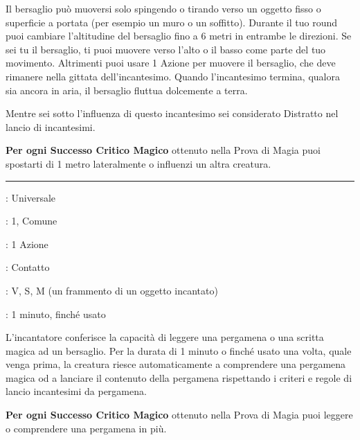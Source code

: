 \begin{multicols}{2}
Il bersaglio può muoversi solo spingendo o tirando verso un oggetto fisso o superficie a portata (per esempio un muro o un soffitto). Durante il tuo round puoi cambiare l'altitudine del bersaglio fino a 6 metri in entrambe le direzioni. Se sei tu il bersaglio, ti puoi muovere verso l'alto o il basso come parte del tuo movimento. Altrimenti puoi usare 1 Azione per muovere il bersaglio, che deve rimanere nella gittata dell'incantesimo. Quando l'incantesimo termina, qualora sia ancora in aria, il bersaglio fluttua dolcemente a terra.

Mentre sei sotto l'influenza di questo incantesimo sei considerato Distratto nel lancio di incantesimi.

\textbf{Per ogni Successo Critico Magico} ottenuto nella Prova di Magia puoi spostarti di 1 metro lateralmente o influenzi un altra creatura.

\smallskip\noindent\rule{\linewidth}{2pt} \hypertarget{Lettura del Magico}{}\medskip{}
\noindent
\begin{description}[noitemsep, topsep=0pt, parsep=0pt, partopsep=0pt, leftmargin=0cm, labelwidth=2.8cm]
	\item[\textbf{Lista di Magia}]: Universale
	\item[\textbf{Livello}]: 1, Comune
	\item[\textbf{T. di Lancio}]: 1 Azione
	\item[\textbf{Gittata}]: Contatto
	\item[\textbf{Componenti}]: V, S, M (un frammento di un oggetto incantato)
	\item[\textbf{Durata}]: 1 minuto, finché usato
\end{description}

L'incantatore conferisce la capacità di leggere una pergamena o una scritta magica ad un bersaglio. Per la durata di 1 minuto o finché usato una volta, quale venga prima, la creatura riesce automaticamente a comprendere una pergamena magica od a lanciare il contenuto della pergamena rispettando i criteri e regole di lancio incantesimi da pergamena.

\textbf{Per ogni Successo Critico Magico} ottenuto nella Prova di Magia puoi leggere o comprendere una pergamena in più.


\end{multicols}
